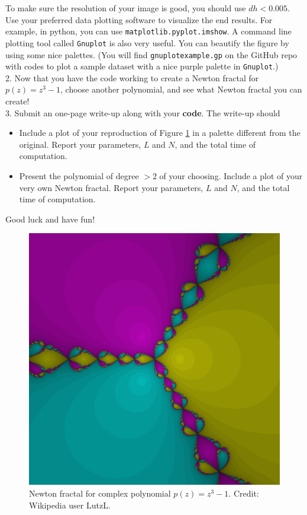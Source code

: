 \documentclass{article}
\begin{document}
To make sure the resolution of your image is good, you should use $dh<0.005$.
Use your preferred data plotting software to visualize the end results. For example, in python, you can use \texttt{matplotlib.pyplot.imshow}. A command line plotting tool called \texttt{Gnuplot} is also very useful.
You can beautify the figure by using some nice palettes. (You will find \texttt{gnuplot\textunderscore example.gp} on the GitHub repo with codes to plot a sample dataset with a nice purple palette in \texttt{Gnuplot}.)
\\

2. Now that you have the code working to create a Newton fractal for $p(z) = z^3-1$, choose another polynomial, and see what Newton fractal you can create!
\\

3. Submit an one-page write-up along with your \textbf{code}. The write-up should 
\begin{itemize}
 \item Include a plot of your reproduction of Figure \ref{fig:nfrac} in a palette different from the original. Report your parameters, $L$ and $N$, and the total time of computation.
 \item Present the polynomial of degree $>2$ of your choosing. Include a plot of your very own Newton fractal. Report your parameters, $L$ and $N$, and the total time of computation.
\end{itemize}
Good luck and have fun!
 
\begin{figure}[t]
\centering
\includegraphics[width = \linewidth]{Newtroot_1_0_0_m1.png}
\caption{Newton fractal for complex polynomial $p(z) = z^3 - 1$. Credit: Wikipedia user LutzL.}
\label{fig:nfrac}
\end{figure}
\end{document}

